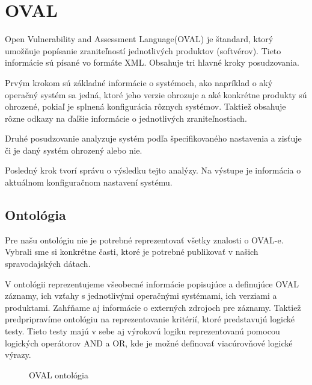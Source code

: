 \documentclass[12pt, a4paper, oneside]{book}
\begin{document}
\section{OVAL}
Open Vulnerability and Assessment Language(OVAL) je štandard, ktorý umožňuje popísanie zraniteľností jednotlivých produktov (softvérov). Tieto informácie sú písané vo formáte XML. Obsahuje tri hlavné kroky posudzovania.


Prvým krokom sú základné informácie o systémoch, ako napríklad o aký operačný systém sa jedná, ktoré jeho verzie ohrozuje a aké konkrétne produkty sú ohrozené, pokiaľ je splnená konfigurácia rôznych systémov. Taktiež obsahuje rôzne odkazy na ďaľšie informácie o jednotlivých zraniteľnostiach. 


Druhé posudzovanie analyzuje systém podľa špecifikovaného nastavenia a zisťuje či je daný systém ohrozený alebo nie. 


Posledný krok tvorí správu o výsledku tejto analýzy. Na výstupe je informácia o aktuálnom konfiguračnom nastavení systému.


\subsection{Ontológia}
Pre našu ontológiu nie je potrebné reprezentovať všetky znalosti o OVAL-e. Vybrali sme si konkrétne časti, ktoré je potrebné publikovať v našich spravodajských dátach. 


V ontológii reprezentujeme všeobecné informácie popisujúce a definujúce OVAL záznamy, ich vzťahy s jednotlivými operačnými systémami, ich verziami a produktami. Zahŕňame aj informácie o externých zdrojoch pre záznamy. Taktiež predpripravíme ontológiu na reprezentovanie kritérií, ktoré predstavujú logické testy. Tieto testy majú v sebe aj výrokovú logiku reprezentovanú pomocou logických operátorov AND a OR, kde je možné definovať viacúrovňové logické výrazy.


\begin{figure}
\label{fig:semantic_web}
\caption{OVAL ontológia}
\end{figure}
\end{document}
